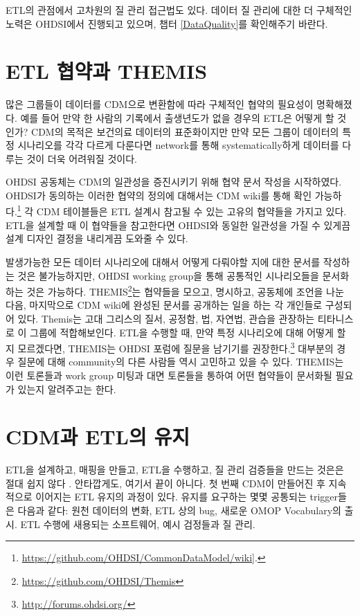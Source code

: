 \documentclass[11pt]{book}
\let\rmarkdownfootnote\footnote%
\def\footnote{\protect\rmarkdownfootnote}
\theoremstyle{definition}
\theoremstyle{definition}
\theoremstyle{definition}
\theoremstyle{remark}
\begin{document}
ETL의 관점에서 고차원의 질 관리 접근법도 있다. 데이터 질 관리에 대한 더
구체적인 노력은 OHDSI에서 진행되고 있으며, 챕터 \ref{DataQuality}를
확인해주기 바란다.

\section{ETL 협약과 THEMIS}\label{etl--themis}

많은 그룹들이 데이터를 CDM으로 변환함에 따라 구체적인 협약의 필요성이
명확해졌다. 예를 들어 만약 한 사람의 기록에서 출생년도가 없을 경우의
ETL은 어떻게 할 것인가? CDM의 목적은 보건의료 데이터의 표준화이지만 만약
모든 그룹이 데이터의 특정 시나리오를 각각 다르게 다룬다면 network를 통해
systematically하게 데이터를 다루는 것이 더욱 어려워질 것이다.

OHDSI 공동체는 CDM의 일관성을 증진시키기 위해 협약 문서 작성을
시작하였다. OHDSI가 동의하는 이러한 협약의 정의에 대해서는 CDM wiki를
통해 확인 가능하다.\footnote{\url{https://github.com/OHDSI/CommonDataModel/wiki}{]}.}
각 CDM 테이블들은 ETL 설계시 참고될 수 있는 고유의 협약들을 가지고 있다.
ETL을 설계할 때 이 협약들을 참고한다면 OHDSI와 동일한 일관성을 가질 수
있게끔 설계 디자인 결정을 내리게끔 도와줄 수 있다.

발생가능한 모든 데이터 시나리오에 대해서 어떻게 다뤄야할 지에 대한
문서를 작성하는 것은 불가능하지만, OHDSI working group을 통해 공통적인
시나리오들을 문서화하는 것은 가능하다. THEMIS\footnote{\url{https://github.com/OHDSI/Themis}}는
협약들을 모으고, 명시하고, 공동체에 조언을 나눈 다음, 마지막으로 CDM
wiki에 완성된 문서를 공개하는 일을 하는 각 개인들로 구성되어 있다.
Themis는 고대 그리스의 질서, 공정함, 법, 자연법, 관습을 관장하는
티타니스로 이 그룹에 적합해보인다. ETL을 수행할 때, 만약 특정 시나리오에
대해 어떻게 할 지 모르겠다면, THEMIS는 OHDSI 포럼에 질문을 남기기를
권장한다.\footnote{\url{http://forums.ohdsi.org/}} 대부분의 경우 질문에
대해 community의 다른 사람들 역시 고민하고 있을 수 있다. THEMIS는 이런
토론들과 work group 미팅과 대면 토론들을 통하여 어떤 협약들이 문서화될
필요가 있는지 알려주고는 한다.

\section{CDM과 ETL의 유지}\label{CDMandETLMaintenance}

ETL을 설계하고, 매핑을 만들고, ETL을 수행하고, 질 관리 검증들을 만드는
것은은 절대 쉽지 않다 . 안타깝게도, 여기서 끝이 아니다. 첫 번째 CDM이
만들어진 후 지속적으로 이어지는 ETL 유지의 과정이 있다. 유지를 요구하는
몇몇 공통되는 trigger들은 다음과 같다: 원천 데이터의 변화, ETL 상의 bug,
새로운 OMOP Vocabulary의 출시. ETL 수행에 새용되는 소프트웨어, 예시
검정들과 질 관리.
\end{document}
